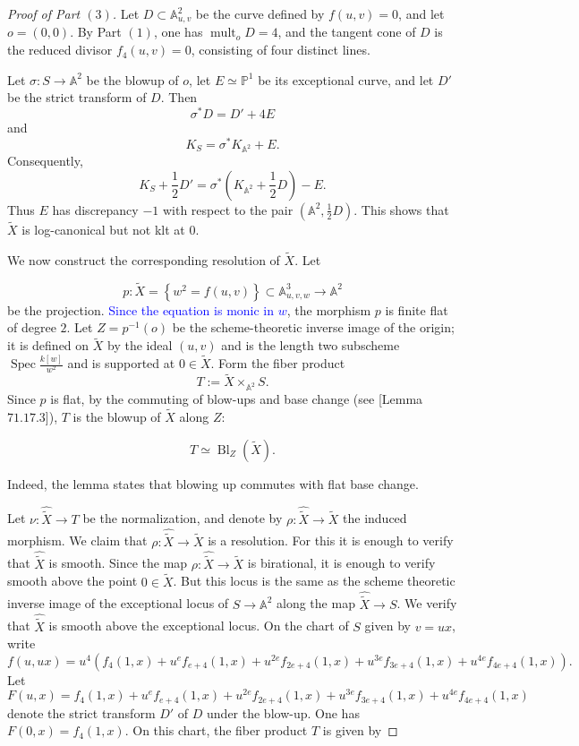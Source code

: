 \documentclass[11pt,twoside]{amsart}
\theoremstyle{plain}
\numberwithin{equation}{section}
\theoremstyle{definition}
\begin{document}
\begin{proof}[Proof of Part $(3)$]
Let $D\subset \mathbb A^2_{u,v}$ be the curve defined by $f(u,v)=0$, and let $o=(0,0)$. By Part $(1)$, one has $\operatorname{mult}_oD=4$, and the tangent cone of $D$ is the reduced divisor $f_4(u,v)=0$, consisting of four distinct lines.

Let $\sigma:S\to\mathbb A^2$ be the blowup of $o$, let $E\simeq\mathbb P^1$ be its exceptional curve, and let $D'$ be the strict transform of $D$. Then
$$
\sigma^*D=D'+4E
$$
and
$$
K_S=\sigma^*K_{\mathbb A^2}+E.
$$
Consequently,
$$
K_S+\frac12D'
= \sigma^*\left(K_{\mathbb A^2}+\frac12D\right)-E.
$$
Thus $E$ has discrepancy $-1$ with respect to the pair $\left(\mathbb A^2,\frac12D\right)$. This shows that $\widetilde{X}$ is log-canonical but not klt at $0$. \par
We now construct the corresponding resolution of $\widetilde X$. Let

$$
p:\widetilde X =\left\{w^2=f(u,v)\right\}\subset
\mathbb{A}^3_{u,v,w}\longrightarrow\mathbb A^2
$$
be the projection. \textcolor{blue}{Since the equation is monic in $w$}, the morphism $p$ is finite flat of degree $2$. Let $Z=p^{-1}(o)$ be the scheme-theoretic inverse image of the origin; it is defined on $\widetilde X$ by the ideal $(u,v)$ and is the length two subscheme $\operatorname{Spec}\displaystyle\frac{k[w]}{w^2}$ and is supported at $0 \in \widetilde X$.
Form the fiber product
$$
T:=\widetilde X\times_{\mathbb A^2}S.
$$
Since $p$ is flat, by the commuting of blow-ups and base change (see \cite{stacks-project}[Lemma $71.17.3$]), $T$ is the blowup of $\widetilde X$ along $Z$:

$$
T\simeq\operatorname{Bl}_Z(\widetilde X).
$$

Indeed, the lemma states that blowing up commutes with flat base change.

Let $\nu:\widehat{\widetilde X}\to T$ be the normalization, and denote by $\rho:\widehat{\widetilde X}\to\widetilde X$ the induced morphism. We claim that $\rho:\widehat{\widetilde X}\to\widetilde X$ is a resolution. For this it is enough to verify that $\widehat{\widetilde X}$ is smooth. Since the map $\rho:\widehat{\widetilde X}\to\widetilde X$ is birational, it is enough to verify smooth above the point $0 \in \widetilde X$. But this locus is the same as the scheme theoretic inverse image of the exceptional locus of $S \to \mathbb{A}^2$ along the map $\widehat{\widetilde X} \to S$. We verify that $\widehat{\widetilde X}$ is smooth above the exceptional locus. On the chart of $S$ given by $v=ux$, write
$$
f(u,ux)= u^4\left(f_4(1,x)+u^ef_{e+4}(1,x)+u^{2e}f_{2e+4}(1,x)+u^{3e}f_{3e+4}(1,x)+u^{4e}f_{4e+4}(1,x)\right).
$$
Let $$F(u,x) =  f_4(1,x)+u^ef_{e+4}(1,x)+u^{2e}f_{2e+4}(1,x)+u^{3e}f_{3e+4}(1,x)+u^{4e}f_{4e+4}(1,x)$$ denote the strict transform $D'$ of $D$ under the blow-up. One has $F(0,x)=f_4(1,x).$
On this chart, the fiber product $T$ is given by


\end{proof}
\end{document}
